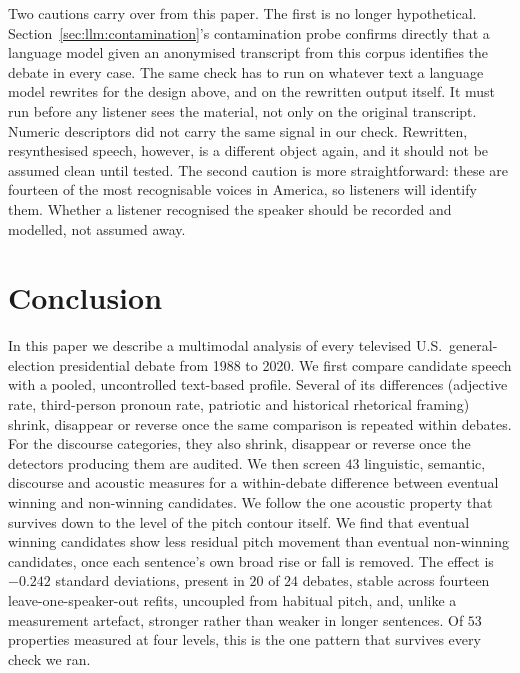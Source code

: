 \documentclass[pdflatex,sn-mathphys-num]{sn-jnl}%
\begin{document}
Two cautions carry over from this paper. The first is no longer
hypothetical. Section~\ref{sec:llm:contamination}'s contamination probe
confirms directly that a language model given an anonymised transcript from
this corpus identifies the debate in every case. The same check has to run
on whatever text a language model rewrites for the design above, and on the
rewritten output itself. It must run before any listener sees the material,
not only on the original transcript. Numeric descriptors did not carry the
same signal in our check. Rewritten, resynthesised speech, however, is a
different object again, and it should not be assumed clean until tested.
The second caution is more straightforward: these are fourteen of the most
recognisable voices in America, so listeners will identify them. Whether a
listener recognised the speaker should be recorded and modelled, not assumed
away.

\section{Conclusion}
\label{sec:concl}

In this paper we describe a multimodal analysis of every televised U.S.\
general-election presidential debate from 1988 to 2020. We first compare
candidate speech with a pooled, uncontrolled text-based profile. Several of
its differences (adjective rate, third-person pronoun rate, patriotic and
historical rhetorical framing) shrink, disappear or reverse once the same
comparison is repeated within debates. For the discourse categories, they
also shrink, disappear or reverse once the detectors producing them are
audited. We then screen
$43$ linguistic, semantic, discourse and acoustic measures for a
within-debate difference between eventual winning and non-winning
candidates. We follow the one acoustic property that survives down to the
level of the pitch contour itself. We find that eventual winning candidates
show less residual
pitch movement than eventual non-winning candidates, once each sentence's
own broad rise or fall is removed. The effect is $-0.242$ standard deviations,
present in $20$ of $24$ debates, stable across fourteen
leave-one-speaker-out refits, uncoupled from habitual pitch, and, unlike a
measurement artefact, stronger rather than weaker in longer sentences. Of
$53$ properties measured at four levels, this is the one pattern that
survives every check we ran.
\end{document}
